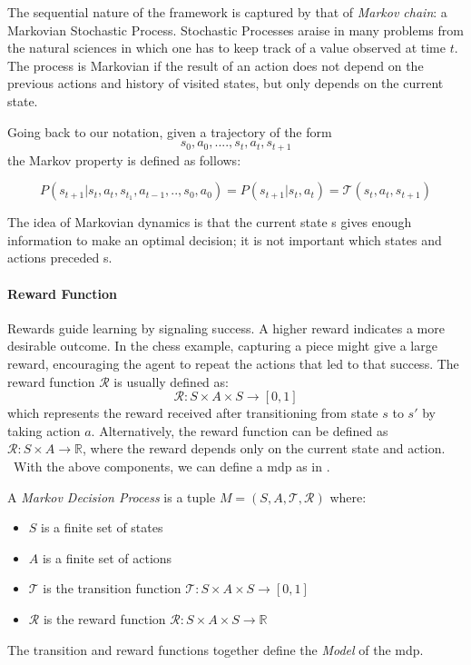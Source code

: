 The sequential nature of the framework is captured by that of \textit{Markov chain}:
a Markovian Stochastic Process. 
Stochastic Processes araise in many problems from the natural sciences
in which one has to keep track of a value observed at time $t$. The process is Markovian if the result of an action does not
depend on the previous actions and history of visited states, but only depends on the
current state.

Going back to our notation, given a trajectory of the form 
$$s_0, a_0, . . . . , s_t, a_t, s_{t+1}$$
the Markov property is defined as follows:

$$P(s_{t+1} | s_t ,a_t ,s_{t_1} ,a_{t-1} , . . ,s_0,a_0) = P(s_{t+1} | s_t ,a_t ) = \mathcal{T} (s_t ,a_t ,s_{t+1} )$$

The idea of Markovian dynamics is that the current state s gives enough information
to make an optimal decision; it is not important which states and actions preceded s.

\paragraph{Reward Function}
Rewards guide learning by signaling success. A higher reward indicates a more 
desirable outcome. In the chess example, capturing a piece might give a large reward, encouraging the 
agent to repeat the actions that led to that success. The reward function $\mathcal{R}$ is usually defined as:
$$\mathcal{R} : S \times A \times S \rightarrow [0,1]$$
which represents the reward received after transitioning from state $s$ to $s'$ by taking action $a$.
Alternatively, the reward function can be defined as $\mathcal{R} : S \times A \rightarrow \mathbb{R}$, 
where the reward depends only on the current state and action. \\


\ With the above components, we can define a \gls{mdp} as in .

\begin{definition}
A \textit{Markov Decision Process} is a tuple $M = (S, A, \mathcal{T}, \mathcal{R})$ where:
\begin{itemize}
    \setlength\itemsep{0.01em}
    \item $S$ is a finite set of states
    \item $A$ is a finite set of actions
    \item $\mathcal{T}$ is the transition function $\mathcal{T} : S \times A \times S \rightarrow [0,1]$
    \item $\mathcal{R}$ is the reward function $\mathcal{R} : S \times A \times S \rightarrow \mathbb{R}$
\end{itemize}
\end{definition}
The transition and reward functions together define the \emph{Model} of
the \gls{mdp}.

